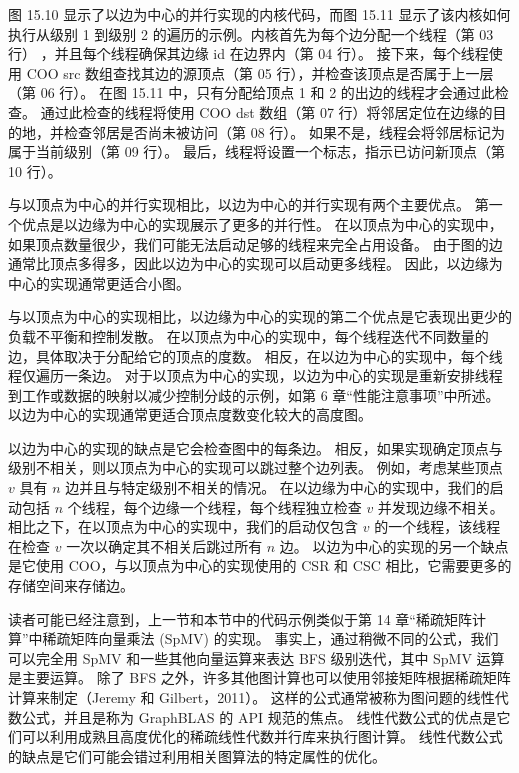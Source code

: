 图 15.10 显示了以边为中心的并行实现的内核代码，而图 15.11 显示了该内核如何执行从级别 1 到级别 2 的遍历的示例。内核首先为每个边分配一个线程（第 03 行） ，并且每个线程确保其边缘 id 在边界内（第 04 行）。 接下来，每个线程使用 COO src 数组查找其边的源顶点（第 05 行），并检查该顶点是否属于上一层（第 06 行）。 在图 15.11 中，只有分配给顶点 1 和 2 的出边的线程才会通过此检查。 通过此检查的线程将使用 COO dst 数组（第 07 行）将邻居定位在边缘的目的地，并检查邻居是否尚未被访问（第 08 行）。 如果不是，线程会将邻居标记为属于当前级别（第 09 行）。 最后，线程将设置一个标志，指示已访问新顶点（第 10 行）。

与以顶点为中心的并行实现相比，以边为中心的并行实现有两个主要优点。 第一个优点是以边缘为中心的实现展示了更多的并行性。 在以顶点为中心的实现中，如果顶点数量很少，我们可能无法启动足够的线程来完全占用设备。 由于图的边通常比顶点多得多，因此以边为中心的实现可以启动更多线程。 因此，以边缘为中心的实现通常更适合小图。

与以顶点为中心的实现相比，以边缘为中心的实现的第二个优点是它表现出更少的负载不平衡和控制发散。 在以顶点为中心的实现中，每个线程迭代不同数量的边，具体取决于分配给它的顶点的度数。 相反，在以边为中心的实现中，每个线程仅遍历一条边。 对于以顶点为中心的实现，以边为中心的实现是重新安排线程到工作或数据的映射以减少控制分歧的示例，如第 6 章“性能注意事项”中所述。 以边为中心的实现通常更适合顶点度数变化较大的高度图。

以边为中心的实现的缺点是它会检查图中的每条边。 相反，如果实现确定顶点与级别不相关，则以顶点为中心的实现可以跳过整个边列表。 例如，考虑某些顶点 $v$ 具有 $n$ 边并且与特定级别不相关的情况。 在以边缘为中心的实现中，我们的启动包括 $n$ 个线程，每个边缘一个线程，每个线程独立检查 $v$ 并发现边缘不相关。 相比之下，在以顶点为中心的实现中，我们的启动仅包含 $v$ 的一个线程，该线程在检查 $v$ 一次以确定其不相关后跳过所有 $n$ 边。 以边为中心的实现的另一个缺点是它使用 $\mathrm{COO}$，与以顶点为中心的实现使用的 CSR 和 CSC 相比，它需要更多的存储空间来存储边。

读者可能已经注意到，上一节和本节中的代码示例类似于第 14 章“稀疏矩阵计算”中稀疏矩阵向量乘法 (SpMV) 的实现。 事实上，通过稍微不同的公式，我们可以完全用 SpMV 和一些其他向量运算来表达 BFS 级别迭代，其中 SpMV 运算是主要运算。 除了 BFS 之外，许多其他图计算也可以使用邻接矩阵根据稀疏矩阵计算来制定（Jeremy 和 Gilbert，2011）。 这样的公式通常被称为图问题的线性代数公式，并且是称为 GraphBLAS 的 API 规范的焦点。 线性代数公式的优点是它们可以利用成熟且高度优化的稀疏线性代数并行库来执行图计算。 线性代数公式的缺点是它们可能会错过利用相关图算法的特定属性的优化。

